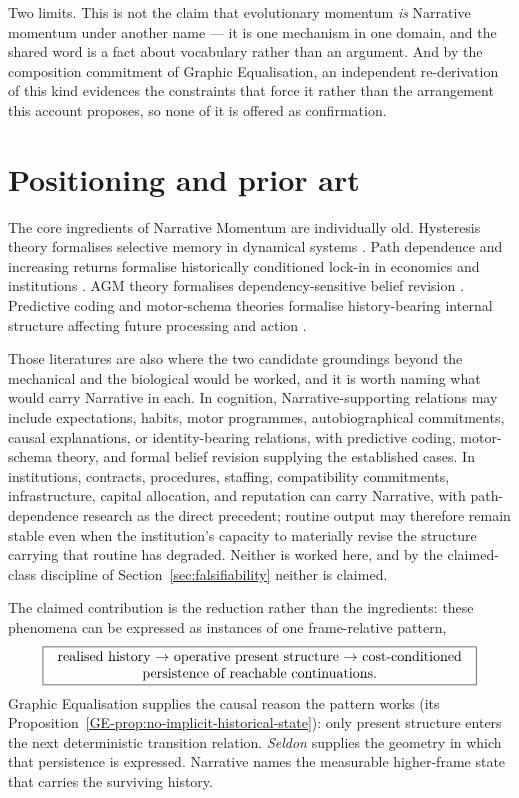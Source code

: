 \documentclass[11pt,a4paper]{article}
\theoremstyle{remark}
\begin{document}
Two limits. This is not the claim that evolutionary momentum \emph{is} Narrative momentum under
another name --- it is one mechanism in one domain, and the shared word is a fact about vocabulary
rather than an argument. And by the composition commitment of Graphic Equalisation, an independent
re-derivation of this kind evidences the constraints that force it rather than the arrangement this
account proposes, so none of it is offered as confirmation.

\section{Positioning and prior art}\label{sec:prior-art}
The core ingredients of Narrative Momentum are individually old. Hysteresis theory formalises selective memory in dynamical systems \citep{mayergoyz1991,mayergoyz2003}. Path dependence and increasing returns formalise historically conditioned lock-in in economics and institutions \citep{david1985,arthur1989,pierson2000}. AGM theory formalises dependency-sensitive belief revision \citep{agm1985}. Predictive coding and motor-schema theories formalise history-bearing internal structure affecting future processing and action \citep{rao1999,schmidt1975}.

Those literatures are also where the two candidate groundings beyond the mechanical and the
biological would be worked, and it is worth naming what would carry Narrative in each. In cognition,
Narrative-supporting relations may include expectations, habits, motor programmes, autobiographical
commitments, causal explanations, or identity-bearing relations, with predictive coding, motor-schema
theory, and formal belief revision supplying the established cases. In institutions, contracts,
procedures, staffing, compatibility commitments, infrastructure, capital allocation, and reputation
can carry Narrative, with path-dependence research as the direct precedent; routine output may
therefore remain stable even when the institution's capacity to materially revise the structure
carrying that routine has degraded. Neither is worked here, and by the claimed-class discipline of
Section~\ref{sec:falsifiability} neither is claimed.

The claimed contribution is the reduction rather than the ingredients: these phenomena can be expressed as instances of one frame-relative pattern,
\[
\boxed{\parbox{0.88\textwidth}{\centering realised history $\rightarrow$ operative present structure $\rightarrow$ cost-conditioned persistence of reachable continuations.}}
\]
Graphic Equalisation supplies the causal reason the pattern works (its Proposition~\ref{GE-prop:no-implicit-historical-state}): only present structure enters the next deterministic transition relation. \emph{Seldon} supplies the geometry in which that persistence is expressed. Narrative names the measurable higher-frame state that carries the surviving history.
\end{document}
